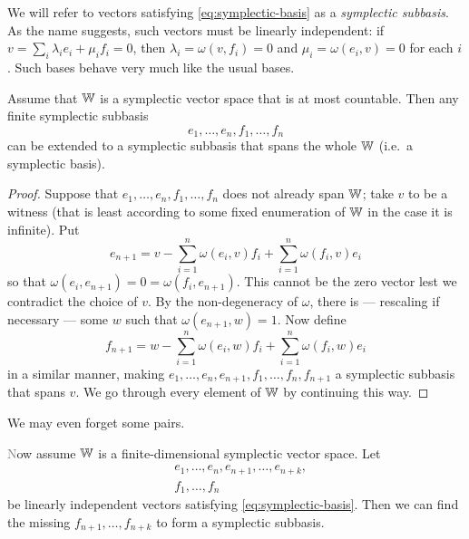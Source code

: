 We will refer to vectors satisfying \eqref{eq:symplectic-basis} as a \emph{symplectic subbasis}. 
As the name suggests, such vectors must be linearly independent:
if $v = \sum_i \lambda_i e_i + \mu_i f_i = 0$, then $\lambda_i = \omega(v, f_i) = 0$ and $\mu_i = \omega(e_i, v) = 0$ for each $i$.
Such bases behave very much like the usual bases.

\begin{proposition}\label{prop:symplectic-basis}
    Assume that $\mathbb{W}$ is a symplectic vector space that is at most countable.
    Then any finite symplectic subbasis \[
        e_1, \ldots, e_n, f_1, \ldots, f_n
    \] 
    can be extended to a symplectic subbasis that spans the whole $\mathbb{W}$ (i.e.~a symplectic basis).
\end{proposition}
\begin{proof}
    Suppose that $e_1, \ldots, e_n, f_1, \ldots, f_n$ does not already span $\mathbb{W}$;
    take $v$ to be a witness (that is least according to some fixed enumeration of $\mathbb{W}$ 
    in the case it is infinite).
    Put
    \[
        e_{n+1} = v - \sum_{i=1}^n \omega(e_i, v) f_i + \sum_{i=1}^n \omega(f_i, v) e_i
    \]
    so that $\omega(e_i, e_{n+1}) = 0 = \omega(f_i, e_{n+1})$.
    This cannot be the zero vector lest we contradict the choice of $v$.
    By the non-degeneracy of $\omega$, there is --- rescaling if necessary 
    --- some $w$ such that $\omega(e_{n+1}, w) = 1$. 
    Now define
    \[
        f_{n+1} = w - \sum_{i=1}^n \omega(e_i, w) f_i + \sum_{i=1}^n \omega(f_i, w) e_i
    \]
    in a similar manner, 
    making $e_1, \ldots, e_n, e_{n+1}, f_1, \ldots, f_n, f_{n+1}$ a symplectic subbasis that spans $v$.
    We go through every element of $\mathbb{W}$ by continuing this way.
\end{proof}

We may even forget some pairs.
\begin{proposition}\label{prop:symplectic-basis-and-a-half}\textcolor{gray}
    Now assume $\mathbb{W}$ is a finite-dimensional symplectic vector space.
    Let 
    \begin{align*} 
        &e_1, \ldots, e_n, e_{n+1}, \ldots, e_{n+k}, \\
        &f_1, \ldots, f_n
    \end{align*}
    be linearly independent vectors satisfying \eqref{eq:symplectic-basis}.
    Then we can find the missing $f_{n+1}, \ldots, f_{n+k}$ to form a symplectic subbasis.
\end{proposition}
\color{black}

